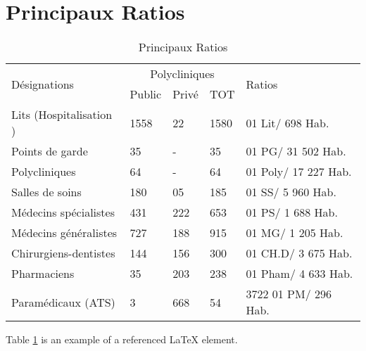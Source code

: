 \section{Principaux Ratios}
\begin{table}[h!]
\begin{center}
\begin{tabular}{|p{4cm}|p{1cm}|p{1cm}|p{1cm}|p{6cm}|}
\hline
\multirow{2}{*}{Désignations} &\multicolumn{3}{c|}{Polycliniques}&\multirow{2}{*}{Ratios}  \\
                              \cline{2-4}
                              &Public	&Privé &TOT                &                    \\
\hline
Lits (Hospitalisation )	                          &1558	&22	  &1580	&01 Lit/ 698 Hab.\\
Points de garde	                                  &35	  &-	  &35	  &01 PG/ 31 502 Hab.\\
Polycliniques	                                    &64	  &-	  &64	  &01 Poly/ 17 227 Hab.\\
Salles de soins	                                  &180  &05	  &185	&01 SS/ 5 960 Hab.\\
Médecins spécialistes	                            &431  &222	&653	&01 PS/ 1 688 Hab.\\
Médecins généralistes	                            &727  &188	&915	&01 MG/ 1 205 Hab.\\
Chirurgiens-dentistes	                            &144  &156	&300	&01 CH.D/ 3 675 Hab.\\
Pharmaciens	                                      &35	  &203	&238	&01 Pham/ 4 633 Hab.\\
Paramédicaux (ATS)	                              &3    &668	&54	  &3722	01 PM/ 296 Hab.\\
\hline
\end{tabular}
\end{center}
\caption{Principaux Ratios}
\label{table:44}
\end{table}
Table \ref{table:44} is an example of a referenced \LaTeX{} element.
